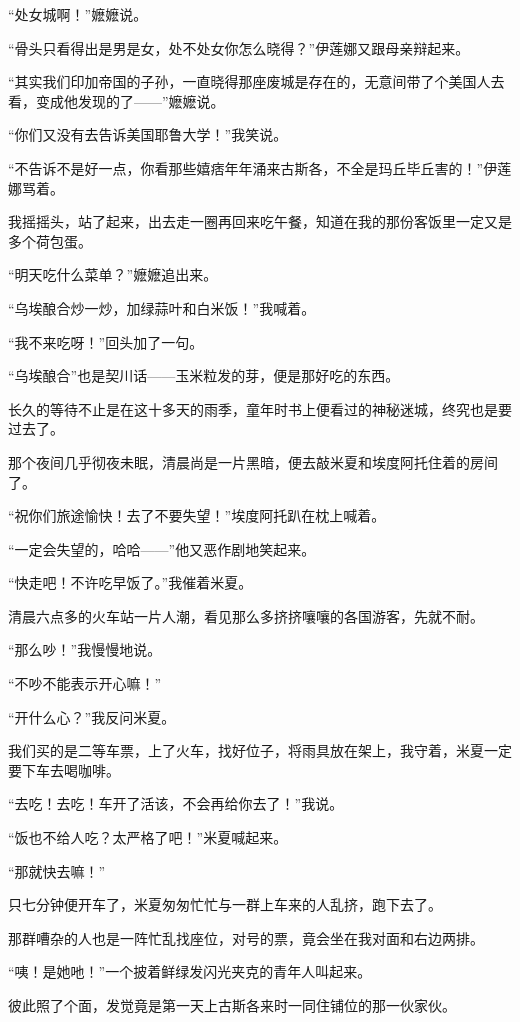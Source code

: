\par “处女城啊！”嬷嬷说。
\par “骨头只看得出是男是女，处不处女你怎么晓得？”伊莲娜又跟母亲辩起来。
\par “其实我们印加帝国的子孙，一直晓得那座废城是存在的，无意间带了个美国人去看，变成他发现的了——”嬷嬷说。
\par “你们又没有去告诉美国耶鲁大学！”我笑说。
\par “不告诉不是好一点，你看那些嬉痞年年涌来古斯各，不全是玛丘毕丘害的！”伊莲娜骂着。
\par 我摇摇头，站了起来，出去走一圈再回来吃午餐，知道在我的那份客饭里一定又是多个荷包蛋。
\par “明天吃什么菜单？”嬷嬷追出来。
\par “乌埃酿合炒一炒，加绿蒜叶和白米饭！”我喊着。
\par “我不来吃呀！”回头加了一句。
\par “乌埃酿合”也是契川话——玉米粒发的芽，便是那好吃的东西。
\par 长久的等待不止是在这十多天的雨季，童年时书上便看过的神秘迷城，终究也是要过去了。
\par 那个夜间几乎彻夜未眠，清晨尚是一片黑暗，便去敲米夏和埃度阿托住着的房间了。
\par “祝你们旅途愉快！去了不要失望！”埃度阿托趴在枕上喊着。
\par “一定会失望的，哈哈——”他又恶作剧地笑起来。
\par “快走吧！不许吃早饭了。”我催着米夏。
\par 清晨六点多的火车站一片人潮，看见那么多挤挤嚷嚷的各国游客，先就不耐。
\par “那么吵！”我慢慢地说。
\par “不吵不能表示开心嘛！”
\par “开什么心？”我反问米夏。
\par 我们买的是二等车票，上了火车，找好位子，将雨具放在架上，我守着，米夏一定要下车去喝咖啡。
\par “去吃！去吃！车开了活该，不会再给你去了！”我说。
\par “饭也不给人吃？太严格了吧！”米夏喊起来。
\par “那就快去嘛！”
\par 只七分钟便开车了，米夏匆匆忙忙与一群上车来的人乱挤，跑下去了。
\par 那群嘈杂的人也是一阵忙乱找座位，对号的票，竟会坐在我对面和右边两排。
\par “咦！是她吔！”一个披着鲜绿发闪光夹克的青年人叫起来。
\par 彼此照了个面，发觉竟是第一天上古斯各来时一同住铺位的那一伙家伙。

